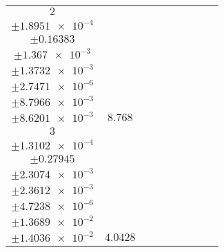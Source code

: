 \documentclass[8pt]{article}
\begin{document}
\begin{longtable}[l]{c c c c c c c c c}
$\num{2}$ & \begin{tabular}[c]{@{}c@{}}$\num{6.4857e-2}$ \\ $\pm\num{1.8951e-4}$\end{tabular} & \begin{tabular}[c]{@{}c@{}}$\num{-3.7188e-2}$ \\ $\pm\num{0.16383}$\end{tabular} & \begin{tabular}[c]{@{}c@{}}$\num{-7.4213}$ \\ $\pm\num{1.367e-3}$\end{tabular} & \begin{tabular}[c]{@{}c@{}}$\num{1.8501e+3}$ \\ $\pm\num{1.3732e-3}$\end{tabular} & \begin{tabular}[c]{@{}c@{}}$\num{3.7013}$ \\ $\pm\num{2.7471e-6}$\end{tabular} & \begin{tabular}[c]{@{}c@{}}$\num{3.5339}$ \\ $\pm\num{8.7966e-3}$\end{tabular} & \begin{tabular}[c]{@{}c@{}}$\num{3.509}$ \\ $\pm\num{8.6201e-3}$\end{tabular} & $\num{8.768}$\\
$\num{3}$ & \begin{tabular}[c]{@{}c@{}}$\num{2.8924e-2}$ \\ $\pm\num{1.3102e-4}$\end{tabular} & \begin{tabular}[c]{@{}c@{}}$\num{-7.1996e-2}$ \\ $\pm\num{0.27945}$\end{tabular} & \begin{tabular}[c]{@{}c@{}}$\num{-5.7301}$ \\ $\pm\num{2.3074e-3}$\end{tabular} & \begin{tabular}[c]{@{}c@{}}$\num{1.8518e+3}$ \\ $\pm\num{2.3612e-3}$\end{tabular} & \begin{tabular}[c]{@{}c@{}}$\num{3.7047}$ \\ $\pm\num{4.7238e-6}$\end{tabular} & \begin{tabular}[c]{@{}c@{}}$\num{3.1209}$ \\ $\pm\num{1.3689e-2}$\end{tabular} & \begin{tabular}[c]{@{}c@{}}$\num{3.1955}$ \\ $\pm\num{1.4036e-2}$\end{tabular} & $\num{4.0428}$\\

\end{longtable}
\end{document}
